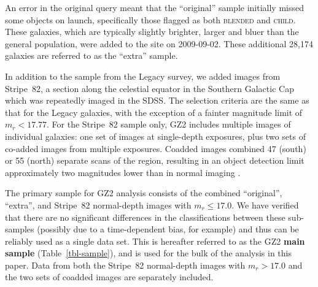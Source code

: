 \documentclass[useAMS,usenatbib]{mn2e}
\begin{document}
An error in the original query meant that the ``original'' sample initially missed some objects on launch, specifically those flagged as both \textsc{blended} and \textsc{child}. These galaxies, which are typically slightly brighter, larger and bluer than the general population, were added to the site on 2009-09-02. These additional 28,174 galaxies are referred to as the ``extra'' sample. 

In addition to the sample from the Legacy survey, we added images from Stripe~82, a section along the celestial equator in the Southern Galactic Cap which was repeatedly imaged in the SDSS. The selection criteria are the same as that for the Legacy galaxies, with the exception of a fainter magnitude limit of $m_r < 17.77$. For the Stripe~82 sample only, GZ2 includes multiple images of individual galaxies: one set of images at single-depth exposures, plus two sets of co-added images from multiple exposures. Coadded images combined 47 (south) or 55 (north) separate scans of the region, resulting in an object detection limit approximately two magnitudes lower than in normal imaging \citep{ann11}. 

The primary sample for GZ2 analysis consists of the combined ``original'', ``extra'', and Stripe~82 normal-depth images with $m_r\leq17.0$. We have verified that there are no significant differences in the classifications between these sub-samples (possibly due to a time-dependent bias, for example) and thus can be reliably used as a single data set. This is hereafter referred to as the GZ2 {\bf main sample} (Table~\ref{tbl-sample}), and is used for the bulk of the analysis in this paper. Data from both the Stripe~82 normal-depth images with $m_r>17.0$ and the two sets of coadded images are separately included. 
\end{document}
